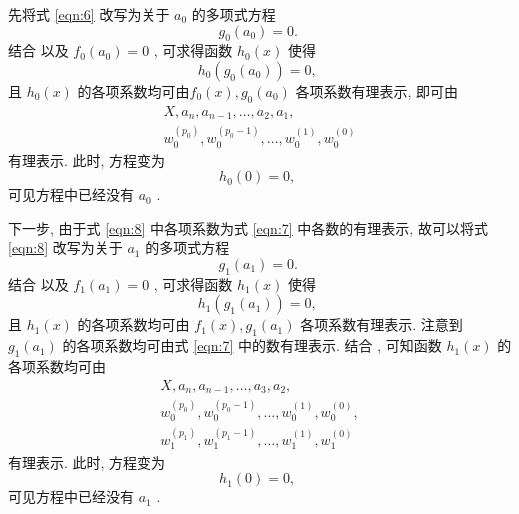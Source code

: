 \documentclass{article}
\renewcommand\.{.\hspace{3pt}}
\renewcommand\,{,\hspace{4pt}}
\renewcommand\:{:\hspace{3pt}}
\begin{document}
	先将式 \eqref{eqn:6} 改写为关于 $a_{0}$ 的多项式方程 $$g_{0} \left( a_{0} \right) = 0 \. $$ 结合 \underline{} 以及 $f_{0} \left( a_{0} \right) = 0$ \, 可求得函数 $h_{0} (x)$ 使得 $$h_{0} \left( g_{0} \left( a_{0} \right) \right) = 0 \,$$ 且 $h_{0} (x)$ 的各项系数均可由$f_{0} (x) , g_{0} \left( a_{0} \right)$ 各项系数有理表示\, 即可由
	\begin{equation} \label{eqn:7}
		\begin{array}{l}
		X , a_{n} , a_{n-1} , \ldots , a_{2} , a_{1} , \\
		w_{0}^{\left( p_{0} \right)} , w_{0}^{\left( p_{0}-1 \right)} , \ldots , w_{0}^{\left( 1 \right)} , w_{0}^{\left( 0 \right)}
		\end{array}
	\end{equation}
	有理表示\. 此时\, 方程变为
	\begin{equation} \label{eqn:8}
		h_{0} (0) = 0 \,
	\end{equation}
	可见方程中已经没有 $a_{0}$ \.
	
	下一步\, 由于式 \eqref{eqn:8} 中各项系数为式 \eqref{eqn:7} 中各数的有理表示\, 故可以将式 \eqref{eqn:8} 改写为关于 $a_{1}$ 的多项式方程 $$g_{1} \left( a_{1} \right) = 0 \. $$ 结合 \underline{} 以及 $f_{1} \left( a_{1} \right) = 0$ \, 可求得函数 $h_{1} (x)$ 使得 $$h_{1} \left( g_{1} \left( a_{1} \right) \right) = 0 \,$$ 且 $h_{1} (x)$ 的各项系数均可由 $f_{1} (x) , g_{1} \left( a_{1} \right)$ 各项系数有理表示\. 注意到 $g_{1} \left( a_{1} \right)$ 的各项系数均可由式 \eqref{eqn:7} 中的数有理表示\. 结合 \underline{} \, 可知函数 $h_{1} (x)$ 的各项系数均可由
	\begin{equation}
		\begin{array}{l}
		X , a_{n} , a_{n-1} , \ldots , a_{3} , a_{2} , \\
		w_{0}^{\left( p_{0} \right)} , w_{0}^{\left( p_{0}-1 \right)} , \ldots , w_{0}^{\left( 1 \right)} , w_{0}^{\left( 0 \right)} , \\
		w_{1}^{\left( p_{1} \right)} , w_{1}^{\left( p_{1}-1 \right)} , \ldots , w_{1}^{\left( 1 \right)} , w_{1}^{\left( 0 \right)}
		\end{array}
	\end{equation}
	有理表示\. 此时\, 方程变为 $$h_{1} (0) = 0 \, $$ 可见方程中已经没有 $a_{1}$ \.
	
\end{document}
